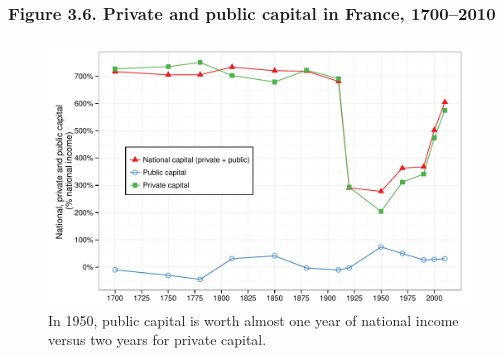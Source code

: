 \documentclass[t]{beamer}\usepackage[]{graphicx}\usepackage[]{color}
\newenvironment{knitrout}{}{} %
\begin{document}
\begin{frame}[label=Figure_3_6]
\frametitle{Figure 3.6. Private and public capital in France, 1700--2010}
\begin{figure}[t]
\begin{minipage}[b]{\textwidth}
\centering
\begin{knitrout}\footnotesize
{}\color{fgcolor}

{\centering \includegraphics[width=1\linewidth]{figures/color/Figure_3_6} 

}



\end{knitrout}
\caption{In 1950, public capital is worth almost one year of national income versus two years for private capital.}
\end{minipage}
\end{figure}
\end{frame}
\end{document}
